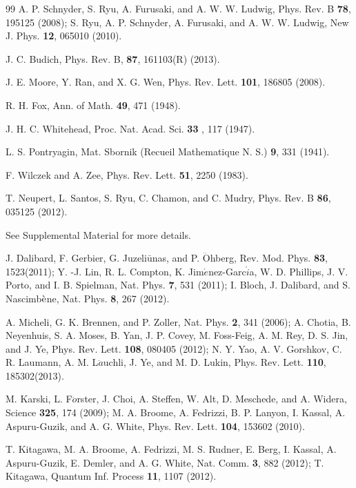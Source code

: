 \documentclass[twocolumn,prb,aps,epsfig,superscriptaddress,showpacs]{revtex4-1}
\begin{document}
\begin{thebibliography}{99}
 A. P. Schnyder, S. Ryu, A. Furusaki, and A. W. W.
Ludwig, Phys. Rev. B \textbf{78}, 195125 (2008); S. Ryu, A. P. Schnyder, A.
Furusaki, and A. W. W. Ludwig, New J. Phys. \textbf{12}, 065010 (2010).

 J. C. Budich, Phys. Rev. B, \textbf{87}, 161103(R)
(2013).

 J. E. Moore, Y. Ran, and X. G. Wen, Phys. Rev. Lett.
\textbf{101}, 186805 (2008).

 R. H. Fox, Ann. of Math. \textbf{49}, 471 (1948).

 J. H. C. Whitehead, Proc. Nat. Acad. Sci. \textbf{33}%
, 117 (1947).

 L. S. Pontryagin, Mat. Sbornik (Recueil
Mathematique N. S.) \textbf{9}, 331 (1941).

 F. Wilczek and A. Zee, Phys. Rev. Lett. \textbf{51},
2250 (1983).

 T. Neupert, L. Santos, S. Ryu, C. Chamon, and C. Mudry, Phys. Rev. B \textbf{86}, 035125 (2012).


 See Supplemental Material for more details.
%

 J. Dalibard, F. Gerbier, G. Juzeli$\bar{\text{u}}$nas,
and P. $\ddot{\text{O}}$hberg, Rev. Mod. Phys. \textbf{83}, 1523(2011);  Y. -J. Lin, R. L. Compton, K. Jim$\acute{e}$nez-Garc$\acute{i}$a,
W. D. Phillips, J. V. Porto, and I. B. Spielman, Nat. Phys. \textbf{7}, 531 (2011); 
I. Bloch, J. Dalibard, and S. Nascimb$\grave{%
\text{e}}$ne, Nat. Phys. \textbf{8}, 267 (2012).

 A. Micheli, G. K. Brennen, and P. Zoller, Nat. Phys.
\textbf{2}, 341 (2006); A. Chotia, B. Neyenhuis, S. A. Moses, B. Yan, J. P. Covey, M. Foss-Feig, A. M. Rey, D. S. Jin, and J. Ye, Phys. Rev. Lett. \textbf{108}, 080405 (2012); N. Y. Yao, A. V. Gorshkov, C. R. Laumann, A. M. L$\ddot{a}$uchli, J. Ye, and M. D. Lukin, Phys. Rev. Lett. \textbf{110}, 185302(2013).

 M. Karski, L. F$\ddot{o}$rster, J. Choi, A. Steffen, W. Alt,
D. Meschede, and A. Widera, Science \textbf{325}, 174 (2009); M. A. Broome, A. Fedrizzi, B. P. Lanyon, I. Kassal, A. Aspuru-Guzik, and A. G. White, Phys. Rev. Lett. \textbf{104}, 153602 (2010).

 T. Kitagawa, M. A. Broome, A. Fedrizzi, M. S. Rudner, E. Berg, I. Kassal, A. Aspuru-Guzik, E. Demler, and A. G. White, Nat. Comm. \textbf{3}, 882 (2012); T. Kitagawa, Quantum Inf. Process \textbf{11}, 1107 (2012).
\end{thebibliography}
\end{document}

